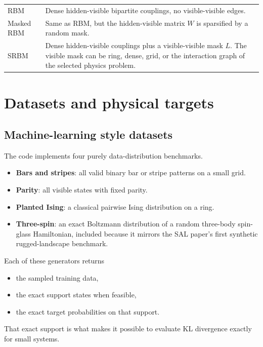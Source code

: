 \documentclass[11pt]{article}
\begin{document}
\begin{center}
\begin{tabular}{>{\raggedright\arraybackslash}p{} p{}}
\toprule
RBM & Dense hidden-visible bipartite couplings, no visible-visible edges. \\
Masked RBM & Same as RBM, but the hidden-visible matrix $W$ is sparsified by a random mask. \\
SRBM & Dense hidden-visible couplings plus a visible-visible mask $L$. The visible mask can be ring, dense, grid, or the interaction graph of the selected physics problem. \\
\bottomrule
\end{tabular}
\end{center}

\section{Datasets and physical targets}

\subsection{Machine-learning style datasets}

The code implements four purely data-distribution benchmarks.

\begin{itemize}
  \item \textbf{Bars and stripes}: all valid binary bar or stripe patterns on a
  small grid.
  \item \textbf{Parity}: all visible states with fixed parity.
  \item \textbf{Planted Ising}: a classical pairwise Ising distribution on a ring.
  \item \textbf{Three-spin}: an exact Boltzmann distribution of a random
  three-body spin-glass Hamiltonian, included because it mirrors the SAL paper's
  first synthetic rugged-landscape benchmark.
\end{itemize}

Each of these generators returns
\begin{itemize}
  \item the sampled training data,
  \item the exact support states when feasible,
  \item the exact target probabilities on that support.
\end{itemize}

That exact support is what makes it possible to evaluate KL divergence exactly
for small systems.
\end{document}
